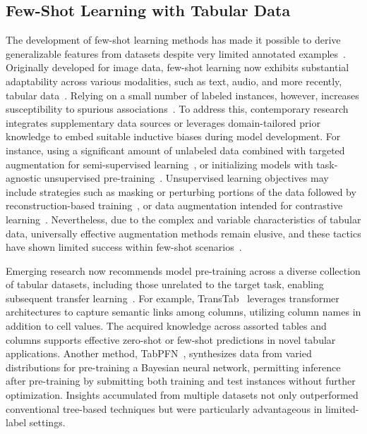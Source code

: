 \subsection{Few-Shot Learning with Tabular Data} The development of few-shot learning methods has made it possible to derive generalizable features from datasets despite very limited annotated examples~\cite{chen2018closer}. Originally developed for image data, few-shot learning now exhibits substantial adaptability across various modalities, such as text, audio, and more recently, tabular data~\cite{majumder2022few,nam2023stunt,schick2021exploiting}. Relying on a small number of labeled instances, however, increases susceptibility to spurious associations~\cite{bartlett2021deep}. To address this, contemporary research integrates supplementary data sources or leverages domain-tailored prior knowledge to embed suitable inductive biases during model development. For instance, using a significant amount of unlabeled data combined with targeted augmentation for semi-supervised learning~\cite{ucar2021subtab,yoon2020vime}, or initializing models with task-agnostic unsupervised pre-training~\cite{somepalli2021saint}. Unsupervised learning objectives may include strategies such as masking or perturbing portions of the data followed by reconstruction-based training~\cite{arik2021tabnet,majmundar2022met}, or data augmentation intended for contrastive learning~\cite{bahri2022scarf,chen2020simple}. Nevertheless, due to the complex and variable characteristics of tabular data, universally effective augmentation methods remain elusive, and these tactics have shown limited success within few-shot scenarios~\cite{nam2023stunt}.

Emerging research now recommends model pre-training across a diverse collection of tabular datasets, including those unrelated to the target task, enabling subsequent transfer learning~\cite{zhang2023generative,levin2022transfer,zhu2023xtab}. For example, TransTab~\cite{wang2022transtab} leverages transformer architectures to capture semantic links among columns, utilizing column names in addition to cell values. The acquired knowledge across assorted tables and columns supports effective zero-shot or few-shot predictions in novel tabular applications. Another method, TabPFN~\cite{hollmann2022tabpfn}, synthesizes data from varied distributions for pre-training a Bayesian neural network, permitting inference after pre-training by submitting both training and test instances without further optimization. Insights accumulated from multiple datasets not only outperformed conventional tree-based techniques but were particularly advantageous in limited-label settings.

